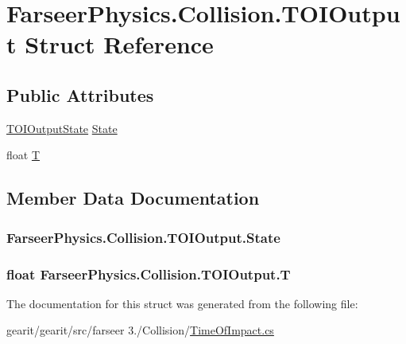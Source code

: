 \hypertarget{struct_farseer_physics_1_1_collision_1_1_t_o_i_output}{\section{Farseer\+Physics.\+Collision.\+T\+O\+I\+Output Struct Reference}
\label{struct_farseer_physics_1_1_collision_1_1_t_o_i_output}
}
\subsection*{Public Attributes}
\begin{DoxyCompactItemize}
\item 
\hyperlink{namespace_farseer_physics_1_1_collision_a5de703d53ee92998e8d95e1ee51613d8}{T\+O\+I\+Output\+State} \hyperlink{struct_farseer_physics_1_1_collision_1_1_t_o_i_output_ae1cb5e09450830f4bfd9d0fb54469298}{State}
\item 
float \hyperlink{struct_farseer_physics_1_1_collision_1_1_t_o_i_output_a4e68dff48de5ea0ad38bfc780728b99d}{T}
\end{DoxyCompactItemize}


\subsection{Member Data Documentation}
\hypertarget{struct_farseer_physics_1_1_collision_1_1_t_o_i_output_ae1cb5e09450830f4bfd9d0fb54469298}{
\subsubsection[{State}]{ Farseer\+Physics.\+Collision.\+T\+O\+I\+Output.\+State}}\label{struct_farseer_physics_1_1_collision_1_1_t_o_i_output_ae1cb5e09450830f4bfd9d0fb54469298}
\hypertarget{struct_farseer_physics_1_1_collision_1_1_t_o_i_output_a4e68dff48de5ea0ad38bfc780728b99d}{
\subsubsection[{T}]{\setlength{\rightskip}{0pt plus 5cm}float Farseer\+Physics.\+Collision.\+T\+O\+I\+Output.\+T}}\label{struct_farseer_physics_1_1_collision_1_1_t_o_i_output_a4e68dff48de5ea0ad38bfc780728b99d}


The documentation for this struct was generated from the following file\+:\begin{DoxyCompactItemize}
\item 
gearit/gearit/src/farseer 3./\+Collision/\hyperlink{_time_of_impact_8cs}{Time\+Of\+Impact.\+cs}\end{DoxyCompactItemize}
